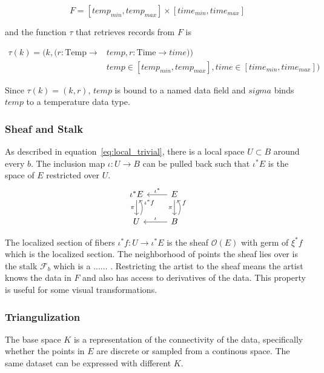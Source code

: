 \documentclass[../main.tex]{subfiles}
\begin{document}
\begin{equation}
F = [temp_{min}, temp_{max}] \times [time_{min}, time_{max}]
\end{equation}

and the function $\tau$ that retrieves records from $F$ is

\begin{align}
\tau(k) =(k, (r: \textrm{Temp}\rightarrow &temp, r: \textrm{Time}\rightarrow time))\\
&temp \in [temp_{min}, temp_{max}], time \in [time_{min}, time_{max}])
\end{align}

Since $\tau(k)=(k, r)$, $temp$ is bound to a named data field and $sigma$ binds $temp$ to a temperature data type. 

\subsubsection{Sheaf and Stalk}
As described in equation~\ref{eq:local_trivial}, there is a local space $U \subset B$ around every $b$. The inclusion map $\iota: U \rightarrow B$ can be pulled back such that $\iota^{*}E$ is the space of $E$ restricted over $U$. 
\begin{equation}
    \label{eq:sheaf}
    \begin{tikzcd}
        \iota^*E \arrow[d, "\pi"']           & E \arrow[d, "\pi"'] \arrow[l, "\iota^*"']         \\
        U \arrow[u, "\iota^*f"', bend right] & B \arrow[u, "f"', bend right] \arrow[l, "\iota"']
        \end{tikzcd}
\end{equation}

The localized section of fibers $\iota^*f: U \rightarrow \iota^*E$ is the sheaf $\mathcal{O}(E)$ with germ of $\xi^*f$ which is the localized section. The neighborhood of points the sheaf lies over is the stalk $\mathcal{F}_b$ \cite{StalkSheaf2019,spanier1989algebraic} which is a ...$\dots$
. Restricting the artist to the sheaf means the artist knows the data in $F$ and also has access to derivatives of the data. This property is useful for some visual transformations. 

\subsubsection{Triangulization}
\label{sec:triangulization}
The base space $K$ is a representation of the connectivity of the data, specifically whether the points in $E$ are discrete or sampled from a continous space. The same dataset can be expressed with different $K$. 
\end{document}
